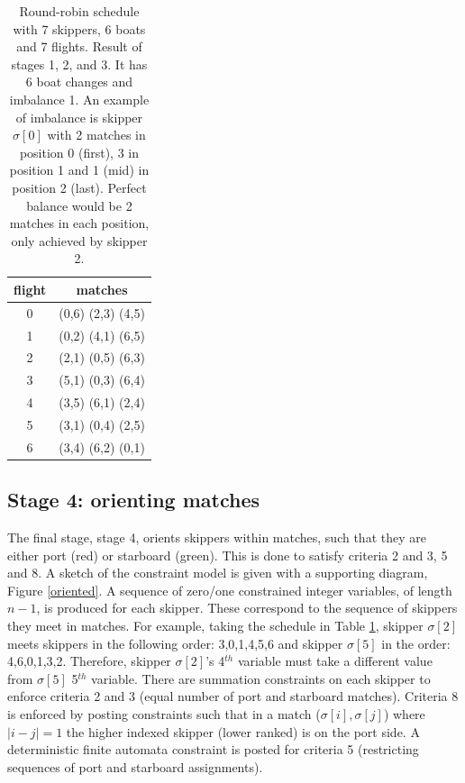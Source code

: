\documentclass{llncs}
\begin{document}
\begin{table}[h]
\begin{center}
\begin{tabular}{cc} \\ 
flight & matches \\ \hline
0 & (0,6) (2,3) (4,5) \\
1 & (0,2) (4,1) (6,5) \\
2 & (2,1) (0,5) (6,3) \\
3 & (5,1) (0,3) (6,4) \\
4 & (3,5) (6,1) (2,4) \\
5 & (3,1) (0,4) (2,5) \\
6 & (3,4) (6,2) (0,1) \\ \hline
\end{tabular}
\end{center}
\caption{Round-robin schedule with 7 skippers, 6 boats and 7 flights. Result of stages 1, 2, and 3. It has 6 boat changes and imbalance 1. An example of imbalance is skipper $\sigma[{0}]$ with 2 matches in position 0 (first), 3 in position 1 and 1 (mid) in position 2 (last). Perfect balance would be 2 matches in each position, only achieved by skipper 2.}
\label{tab2}
\end{table}

\subsection{Stage 4: orienting matches}
The final stage, stage 4, orients skippers within matches, such that they are either port (red) or starboard (green). This is done to satisfy criteria 2 and 3, 5 and 8. A sketch of the constraint model is given with a supporting diagram, Figure \ref{oriented}.  A sequence of zero/one constrained integer variables, of length $n-1$, is produced for each skipper. These correspond to the sequence of skippers they meet in matches. For example, taking the schedule in Table \ref{tab2}, skipper $\sigma[{2}]$ meets skippers in the following order: 3,0,1,4,5,6 and skipper $\sigma[{5}]$ in the order: 4,6,0,1,3,2. Therefore, skipper $\sigma[{2}]$'s 4$^{th}$ variable must take a different value from $\sigma[{5}]$ 5$^{th}$ variable. There are summation constraints on each skipper to enforce criteria 2 and 3 (equal number of port and starboard matches). Criteria 8 is enforced by posting constraints such that in a match ($\sigma[{i}],\sigma[{j}]$) where $|i - j| = 1$ the higher indexed skipper (lower ranked) is on the port side. A deterministic finite automata constraint is posted for criteria 5 (restricting sequences of port and starboard assignments). 
\end{document}
